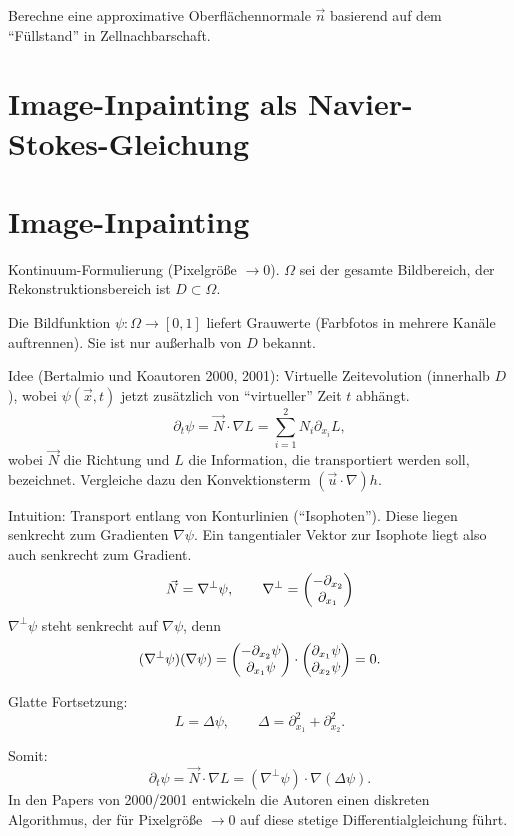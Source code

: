 Berechne eine approximative Oberflächennormale $\vec{n}$ basierend auf dem
``Füllstand'' in Zellnachbarschaft.

\section{Image-Inpainting als Navier-Stokes-Gleichung}
\section*{Image-Inpainting}
Kontinuum-Formulierung (Pixelgröße $\to 0$). $\Omega$ sei der gesamte
Bildbereich, der Rekonstruktionsbereich ist $D \subset \Omega$.

Die Bildfunktion $\psi: \Omega \to [0,1]$ liefert Grauwerte (Farbfotos in
mehrere Kanäle auftrennen). Sie ist nur außerhalb von $D$ bekannt.

Idee (Bertalmio und Koautoren 2000, 2001): Virtuelle Zeitevolution (innerhalb
$D$), wobei $\psi(\vec{x},t)$ jetzt zusätzlich von ``virtueller'' Zeit $t$
abhängt.
\[ \partial_t \psi = \vec{N} \cdot \nabla L = \sum_{i=1}^2 N_i \partial_{x_i} L, \]
wobei $\vec{N}$ die Richtung und $L$ die Information, die transportiert werden
soll, bezeichnet. Vergleiche dazu den Konvektionsterm $(\vec{u} \cdot \nabla)
h$.

Intuition: Transport entlang von Konturlinien (``Isophoten''). Diese liegen
senkrecht zum Gradienten $\nabla \psi$. Ein tangentialer Vektor zur Isophote
liegt also auch senkrecht zum Gradient.
\[ \vec{N} = \nabla^\perp \psi, \qquad \nabla^\perp
  = \begin{pmatrix}-\partial_{x_2} \\ \partial_{x_1}\end{pmatrix} \]
$\nabla^\perp \psi$ steht senkrecht auf $\nabla \psi$, denn
\[ (\nabla^\perp \psi)(\nabla \psi)
  = \begin{pmatrix}-\partial_{x_2} \psi \\ \partial_{x_1} \psi\end{pmatrix}
  \cdot \begin{pmatrix}\partial_{x_1} \psi \\ \partial_{x_2} \psi\end{pmatrix} = 0. \]

Glatte Fortsetzung:
\[ L = \Delta \psi, \qquad \Delta = \partial_{x_1}^2 + \partial_{x_2}^2. \]

Somit:
\[ \partial_t \psi = \vec{N} \cdot \nabla L = (\nabla^\perp \psi) \cdot \nabla
  (\Delta \psi). \]
In den Papers von 2000/2001 entwickeln die Autoren einen diskreten Algorithmus,
der für Pixelgröße $\to 0$ auf diese stetige Differentialgleichung führt.

